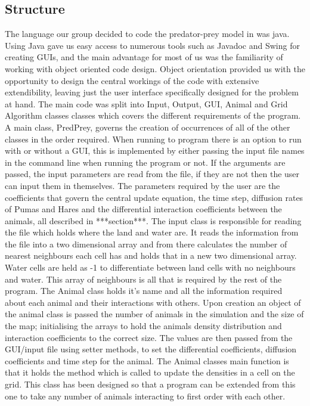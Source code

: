 \documentclass[11pt]{report}
\begin{document}
      \subsection{Structure} %
          The language our group decided to code the predator-prey model in was java. Using Java gave us easy access to numerous tools such as Javadoc and Swing for creating GUIs, and the main advantage for most of us was the familiarity of working with object oriented code design. Object orientation provided us with the opportunity to design the central workings of the code with extensive extendibility, leaving just the user interface specifically designed for the problem at hand. The main code was split into Input, Output, GUI, Animal and Grid Algorithm classes classes which covers the different requirements of the program. A main class, PredPrey, governs the creation of occurrences of all of the other classes in the order required.  When running to program there is an option to run with or without a GUI, this is  implemented by either passing the input file names in the command line when running the program or not. If the arguments are passed, the input parameters are read from the file, if they are not then the user can input them in themselves. The parameters required by the user are the coefficients that govern the central update equation, the time step, diffusion rates of Pumas and Hares and the differential interaction coefficients between the animals, all described in ***section***.
          The input class is responsible for reading the file which holds where the land and water are. It reads the information from the file into a two dimensional array and from there calculates the number of nearest neighbours each cell has and holds that in a new two dimensional array. Water cells are held as -1 to differentiate between land cells with no neighbours and water. This array of neighbours is all that is required by the rest of the program.
          The Animal class holds it's name and all the information required about each animal and their interactions with others. Upon creation an object of the animal class is passed the number of animals in the simulation and the size of the map; initialising the arrays to hold the animals density distribution and interaction coefficients to the correct size. The values are then passed from the GUI/input file using setter methods, to set the differential coefficients, diffusion coefficients and time step for the animal. The Animal classes main function is that it holds the method which is called to update the densities in a cell on the grid. This class has been designed so that a program can be extended from this one to take any number of animals interacting to first order with each other.
\end{document}
